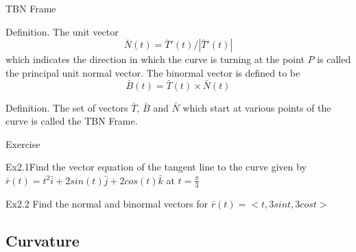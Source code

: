 \documentclass[aspectratio=169, UTF8]{ctexbeamer}
\begin{document}
    \begin{frame}[t]{TBN Frame}
        \begin{block}
            \par \textcolor{yy}{Definition.} The unit vector $$\bar{N} (t) = \bar{T}'(t) / |\bar{T}'(t)|$$ which indicates the direction in which the curve is turning at the point $P$ is called the \textcolor{yy}{principal unit normal vector}.
            The binormal vector is defined to be
            \begin{equation*}
                \bar{B}(t) = \bar{T}(t) \times \bar{N}(t)
            \end{equation*}
        \end{block}

        \begin{block}
            \par \textcolor{yy}{Definition.} The set of vectors $\bar{T}$, $\bar{B}$ and $\bar{N}$ which start at various points of the curve is called the \textcolor{yy}{TBN Frame}.
        \end{block}
    \end{frame}

\begin{frame}[t]{Exercise}
    \par \textcolor{yy}{Ex2.1}Find the vector equation of the tangent line to the curve given by $\bar{r}(t) = t^2\bar{i}+2sin(t)\bar{j}+2cos(t)\bar{k}$ at $t = \frac{\pi}{3}$
    \par \textcolor{yy}{Ex2.2} Find the normal and binormal vectors for $\bar{r}(t) = <t, 3sint, 3cost>$
\end{frame}

    \subsection{Curvature} 
\end{document}
